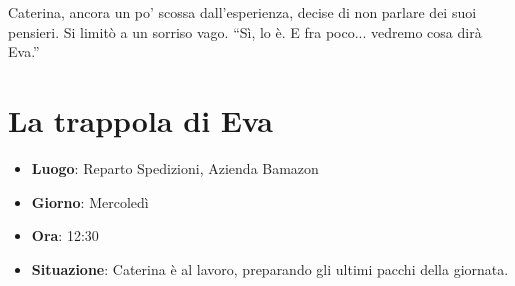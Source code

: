 Caterina, ancora un po' scossa dall'esperienza, decise di non parlare dei suoi pensieri. Si limitò a un sorriso vago. \enquote{Sì, lo è. E fra poco... vedremo cosa dirà Eva.}
\begin{center}
\begin{minipage}{0.7\textwidth}
    \centering
    
\end{minipage}
\end{center}


\section{La trappola di Eva}

\begin{tcolorbox}[colback=gray!5,colframe=gray!80,title=\textbf{Scheda Informativa}]
\begin{itemize}
    \item \textbf{Luogo}: Reparto Spedizioni, Azienda Bamazon
    \item \textbf{Giorno}: Mercoledì
    \item \textbf{Ora}: 12:30
    \item \textbf{Situazione}: Caterina è al lavoro, preparando gli ultimi pacchi della giornata.
\end{itemize}
\end{tcolorbox}

